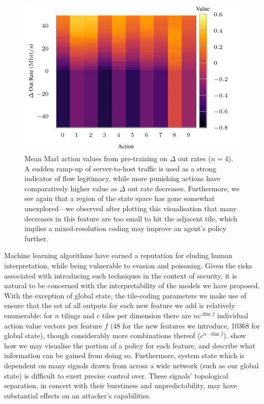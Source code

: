 \documentclass[conference, letterpaper, 10pt, times]{IEEEtran}
\begin{document}
\begin{figure}
	\centering
	\includegraphics[width=0.9\linewidth]{../plots/policy-4-tcp-f7-mean}
	
	\caption{
		Mean Marl action values from pre-training on $\Delta$ out rates ($n=4$).
		A sudden ramp-up of server-to-host traffic is used as a strong indicator of flow legitimacy, while more punishing actions have comparatively higher value as $\Delta$ out rate decreases.
		Furthermore, we see again that a region of the state space has gone somewhat unexplored---we observed after plotting this visualisation that many decreases in this feature are too small to hit the adjacent tile, which implies a mixed-resolution coding may improve an agent's policy further.
		\label{fig:intern-16-tcp-something}
	}
\end{figure}

Machine learning algorithms have earned a reputation for eluding human interpretation, while being vulnerable to evasion and poisoning.
Given the risks associated with introducing such techniques in the context of security, it is natural to be concerned with the interpretability of the models we have proposed.
With the exception of global state, the tile-coding parameters we make use of ensure that the set of all outputs for each new feature we add is relatively enumerable: for $n$ tilings and $c$ tiles per dimension there are $nc^{\dim{f}}$ individual action value vectors per feature $f$ (\num{48} for the new features we introduce, \num{10368} for global state), though considerably more combinations thereof ($c^{n \cdot \dim{f}}$).
 show how we may visualise the portion of a policy for each feature, and describe what information can be gained from doing so.
Furthermore, system state which is dependent on many signals drawn from across a wide network (such as our global state) is difficult to exert precise control over.
These signals' topological separation, in concert with their burstiness and unpredictability, may have substantial effects on an attacker's capabilities.
\end{document}

